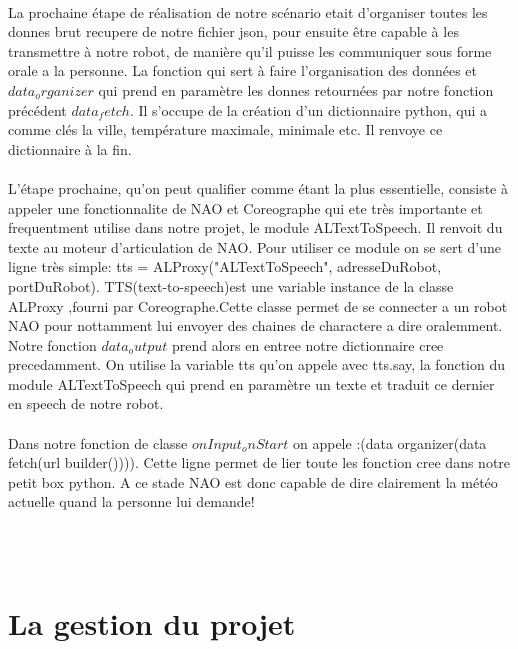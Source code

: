 \documentclass[a4paper,11pt]{article}
\begin{document}
\paragraph{} La prochaine étape de réalisation de notre scénario etait d'organiser toutes les donnes brut recupere de notre fichier json, pour ensuite être capable à les transmettre à notre robot, de manière qu'il puisse les communiquer sous forme orale a la personne. La fonction qui sert à faire l'organisation des données et $data_organizer$ qui prend en paramètre les donnes retournées par notre fonction précédent $data_fetch$. Il s'occupe de la création d'un dictionnaire python, qui a comme clés la ville, température maximale, minimale etc. Il renvoye ce dictionnaire à la fin.
\paragraph{}L'étape prochaine, qu'on peut qualifier comme étant la plus essentielle, consiste à appeler une fonctionnalite de NAO et Coreographe qui ete très importante et frequentment utilise dans notre projet, le module ALTextToSpeech. Il renvoit du texte au moteur d'articulation de NAO. Pour utiliser ce module on se sert d'une ligne très simple: tts = ALProxy("ALTextToSpeech", adresseDuRobot, portDuRobot). TTS(text-to-speech)est une variable instance de la classe ALProxy ,fourni par Coreographe.Cette classe permet de se connecter a un robot NAO pour nottamment lui envoyer des chaines de charactere a dire oralemment.
\newline Notre fonction $data_output$ prend alors en entree notre dictionnaire cree precedamment. On utilise la variable tts qu'on appele avec tts.say, la fonction du module ALTextToSpeech qui prend en paramètre un texte et traduit ce dernier en speech de notre robot.
\paragraph{} Dans notre fonction de classe $onInput_onStart$ on appele :(data organizer(data fetch(url builder()))). Cette ligne permet de lier toute les fonction cree dans notre petit box python.
\newline A ce stade  NAO est donc capable de dire clairement la météo actuelle quand la personne lui demande!

	
~\\
~\\
\section{ La gestion du projet  }
\end{document}
